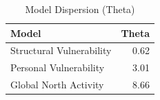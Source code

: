 \begin{table}[ht]
\centering
\begin{tabular}{lr}
  \hline
Model & Theta \\ 
  \hline
Structural Vulnerability & 0.62 \\ 
  Personal Vulnerability & 3.01 \\ 
  Global North Activity & 8.66 \\ 
   \hline
\end{tabular}
\caption{Model Dispersion (Theta)} 
\end{table}
